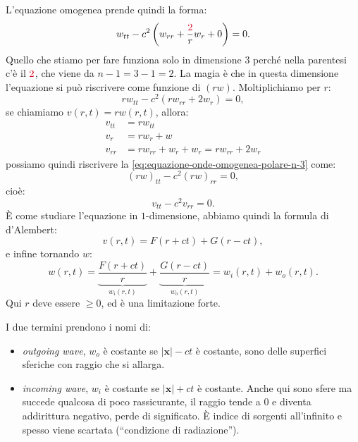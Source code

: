\documentclass[10pt,a4paper,twoside,openright]{book}
\newcommand{\x}{\mathbf{x}}
\begin{document}
L'equazione omogenea prende quindi la forma:
\begin{equation}
	w_{tt} -c^{2}\left(w_{rr} +\frac{\textcolor[rgb]{0.82,0.01,0.11}{2}}{r} w_{r} +0\right) =0.
	\label{eq:equazione-onde-omogenea-polare-n-3}
\end{equation}
Quello che stiamo per fare funziona solo in dimensione $3$ perché nella parentesi c'è il $\textcolor[rgb]{0.82,0.01,0.11}{2}$, che viene da $n-1=3-1=2$. La magia è che in questa dimensione l'equazione si può riscrivere come funzione di $(rw)$. Moltiplichiamo per $r$:
\begin{equation*}
	rw_{tt} -c^{2}(rw_{rr} +2w_{r}) =0,
\end{equation*}
se chiamiamo $v(r,t) =rw(r,t)$, allora:
\begin{align*}
	v_{tt} & =rw_{tt}                                \\
	v_{r}  & =rw_{r} +w                              \\
	v_{rr} & =rw_{rr} +w_{r} +w_{r} =rw_{rr} +2w_{r} 
\end{align*}
possiamo quindi riscrivere la \eqref{eq:equazione-onde-omogenea-polare-n-3} come:
\begin{equation}
	(rw)_{tt} -c^{2}(rw)_{rr} =0,
\end{equation}
cioè:
\begin{equation}
	v_{tt} -c^{2} v_{rr} =0.
\end{equation}
È come studiare l'equazione in $1$-dimensione, abbiamo quindi la formula di d'Alembert:
\begin{equation}
	v(r,t) =F(r+ct) +G(r-ct) ,
\end{equation}
e infine tornando $w$:
\begin{equation}
	\boxed{w(r,t) =\underbrace{\frac{F(r+ct)}{r}}_{w_{i}(r,t)} +\underbrace{\frac{G(r-ct)}{r}}_{w_{o}(r,t)} =w_{i}(r,t) +w_{o}(r,t)} .
\end{equation}
Qui $r$ deve essere $\geqslant 0$, ed è una limitazione forte.

I due termini prendono i nomi di:
\begin{itemize}
	\item \textit{outgoing wave}, $w_{o}$ è costante se $| \x| -ct$ è costante, sono delle superfici sferiche con raggio che si allarga.
	\item \textit{incoming wave}, $w_{i}$ è costante se $| \x| +ct$ è costante. Anche qui sono sfere ma succede qualcosa di poco rassicurante, il raggio tende a $0$ e diventa addirittura negativo, perde di significato. È indice di sorgenti all'infinito e spesso viene scartata (``condizione di radiazione'').
\end{itemize}
\end{document}
